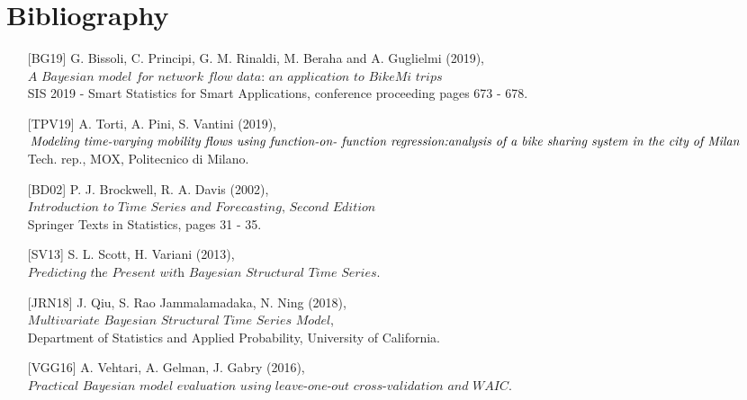 \documentclass[11pt,twoside]{report}
\begin{document}
\appendix
\chapter{Bibliography}
\begin{itemize}[noitemsep,topsep=0pt,parsep=0pt,partopsep=0pt,labelwidth=1.4cm,align=left,itemindent=0cm]
	\item[{[BG19]}] G. Bissoli, C. Principi, G. M. Rinaldi, M. Beraha and
	A. Guglielmi (2019),\\ $ \textit{A Bayesian model for network flow data: an application to BikeMi trips} $\\ SIS 2019 - Smart Statistics for Smart Applications, conference proceeding pages	673 - 678.
	\item[{[TPV19]}] A. Torti, A. Pini, S. Vantini (2019),\\ $ \textit{Modeling time-varying mobility flows using function-on-
	function regression:}\\ \textit{analysis of a bike sharing system in the city of Milan} $\\ Tech. rep., MOX, Politecnico di Milano.
	\item[{[BD02]}] P. J. Brockwell, R. A. Davis (2002),\\ $ \textit{Introduction to Time Series and Forecasting, Second Edition} $\\ Springer Texts in Statistics, pages 31 - 35.
	\item[{[SV13]}] S. L. Scott,
	H. Variani (2013),\\ $ \textit{Predicting the Present with Bayesian Structural Time Series} $.
	\item[{[JRN18]}] J. Qiu, S. Rao Jammalamadaka, 
	N. Ning (2018),\\ $ \textit{Multivariate Bayesian Structural Time Series Model} $,\\Department of Statistics and Applied Probability,
	University of California.
	\item[{[VGG16]}] A. Vehtari, A. Gelman, J. Gabry (2016),\\ $ \textit{Practical Bayesian model evaluation using leave-one-out cross-validation and WAIC} $.
\end{itemize}
\end{document}
